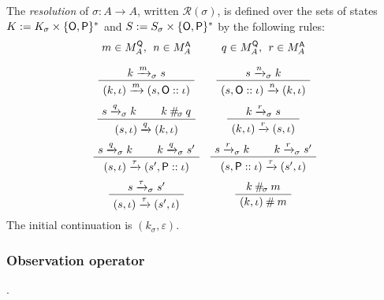 \begin{definition} %
The \emph{resolution} of $\sigma : A \rightarrow A$,
written $\mathcal{R}(\sigma)$,
is defined over the sets of states
$K := K_\sigma \times \{ \mathsf{O} ,  \mathsf{P} \}^*$ and
$S := S_\sigma \times \{ \mathsf{O} ,  \mathsf{P} \}^*$
by the following rules:
\[
  \begin{array}{cc}
    {\small m \in M_A^\kw{Q}, \:\: n \in M_A^\kw{A}}
    &
    {\small q \in M_A^\kw{Q}, \:\: r \in M_A^\kw{A}}
    \\[1em]
    \AxiomC{$k \xrightarrow{m}_\sigma s$}
    \UnaryInfC{$(k, \iota) \xrightarrow{m} (s, \kw{O} :: \iota)$}
    \DisplayProof
    &
    \AxiomC{$s \xrightarrow{n}_\sigma k$}
    \UnaryInfC{$(s, \kw{O} :: \iota) \xrightarrow{n} (k, \iota)$}
    \DisplayProof
    \\[1.5em]
    \AxiomC{$s \xrightarrow{q}_\sigma k$}
    \AxiomC{$k \:\#_{\!\sigma}\: q$}
    \BinaryInfC{$(s, \iota) \xrightarrow{q} (k, \iota)$}
    \DisplayProof
    &
    \AxiomC{$k \xrightarrow{r}_\sigma s$}
    \UnaryInfC{$(k, \iota) \xrightarrow{r} (s, \iota)$}
    \DisplayProof
    \\[1.5em]
    \AxiomC{$s \xrightarrow{q}_\sigma k$}
    \AxiomC{$k \xrightarrow{q}_\sigma s'$}
    \BinaryInfC{$(s, \iota) \xrightarrow{\tau} (s', \kw{P} :: \iota)$}
    \DisplayProof
    &
    \AxiomC{$s \xrightarrow{r}_\sigma k$}
    \AxiomC{$k \xrightarrow{r}_\sigma s'$}
    \BinaryInfC{$(s, \kw{P} :: \iota) \xrightarrow{\tau} (s', \iota)$}
    \DisplayProof
    \\[1.5em]
    \AxiomC{$s \xrightarrow{\tau}_\sigma s'$}
    \UnaryInfC{$(s, \iota) \xrightarrow{\tau} (s', \iota)$}
    \DisplayProof
    &
    \AxiomC{$k \:\#_{\!\sigma}\: m$}
    \UnaryInfC{$(k, \iota) \:\#\: m$}
    \DisplayProof
  \end{array}
\]
The initial continuation is $(k_{\sigma}, \varepsilon)$.
\end{definition}


\subsubsection{Observation operator} %

.



